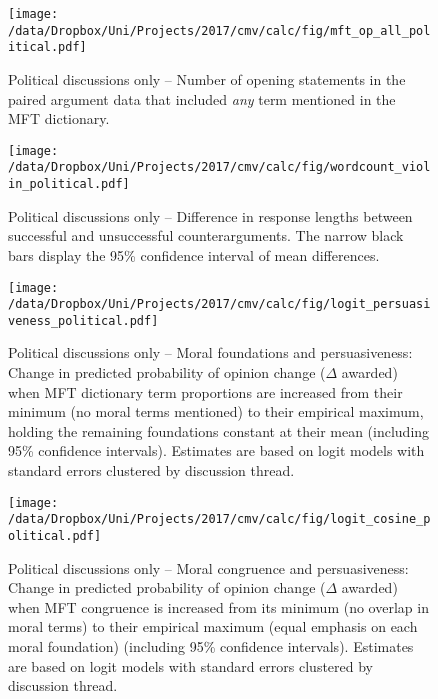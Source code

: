 \begin{figure}[ht]
	\centering
	\texttt{[image: /data/Dropbox/Uni/Projects/2017/cmv/calc/fig/mft\_op\_all\_political.pdf]}
	\caption[Political discussions only -- Number of opening statements in the paired argument data that included \textit{any} term mentioned in the MFT dictionary]{Political discussions only -- Number of opening statements in the paired argument data that included \textit{any} term mentioned in the MFT dictionary.}\label{fig:mft_op_all_political}
\end{figure}

\begin{figure}[ht]
	\centering
	\texttt{[image: /data/Dropbox/Uni/Projects/2017/cmv/calc/fig/wordcount\_violin\_political.pdf]}
	\caption[Political discussions only -- Difference in response lengths between successful and unsuccessful counterarguments]{Political discussions only -- Difference in response lengths between successful and unsuccessful counterarguments. The narrow black bars display the 95\% confidence interval of mean differences.}\label{fig:wordcount_violin_political}
\end{figure}

\begin{figure}[ht]
	\centering
	\texttt{[image: /data/Dropbox/Uni/Projects/2017/cmv/calc/fig/logit\_persuasiveness\_political.pdf]}
	\caption[Political discussions only -- Moral foundations and persuasiveness]{Political discussions only -- Moral foundations and persuasiveness: Change in predicted probability of opinion change ($\Delta$ awarded) when MFT dictionary term proportions are increased from their minimum (no moral terms mentioned) to their empirical maximum, holding the remaining foundations constant at their mean (including 95\% confidence intervals). Estimates are based on logit models with standard errors clustered by discussion thread.}\label{fig:persuasiveness_political}
\end{figure}

\begin{figure}[ht]
	\centering
	\texttt{[image: /data/Dropbox/Uni/Projects/2017/cmv/calc/fig/logit\_cosine\_political.pdf]}
	\caption[Political discussions only -- Moral congruence and persuasiveness]{Political discussions only -- Moral congruence and persuasiveness: Change in predicted probability of opinion change ($\Delta$ awarded) when MFT congruence is increased from its minimum (no overlap in moral terms) to their empirical maximum (equal emphasis on each moral foundation) (including 95\% confidence intervals). Estimates are based on logit models with standard errors clustered by discussion thread.}\label{fig:cosine_political}
\end{figure}